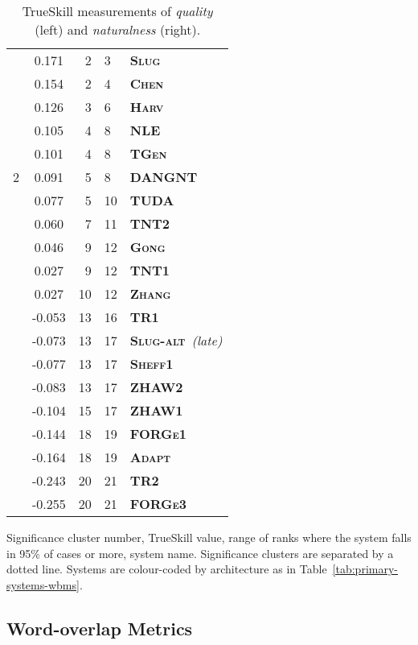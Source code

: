 \documentclass[11pt,a4paper]{article}
\newcommand\tgen{\textsc{TGen}\xspace}
\newcommand\slug{\textsc{Slug}\xspace}
\newcommand\slugalt{\textsc{Slug-alt}\xspace}
\newcommand\tntnlgi{\textsc{TNT1}\xspace}
\newcommand\tntnlgii{\textsc{TNT2}\xspace}
\newcommand\zhawi{\textsc{ZHAW1}\xspace}
\newcommand\zhawii{\textsc{ZHAW2}\xspace}
\newcommand\adapt{\textsc{Adapt}\xspace}
\newcommand\dangnt{\textsc{DANGNT}\xspace}
\newcommand\forgei{\textsc{FORGe1}\xspace}
\newcommand\forgeiii{\textsc{FORGe3}\xspace}
\newcommand\gong{\textsc{Gong}\xspace}
\newcommand\harv{\textsc{Harv}\xspace}
\newcommand\nle{\textsc{NLE}\xspace}
\newcommand\sheffi{\textsc{Sheff1}\xspace}
\newcommand\chen{\textsc{Chen}\xspace}
\newcommand\thomsoni{\textsc{TR1}\xspace}
\newcommand\thomsonii{\textsc{TR2}\xspace}
\newcommand\tuda{\textsc{TUDA}\xspace}
\newcommand\zhang{\textsc{Zhang}\xspace}
\newcommand{\symbseq}{}
\newcommand{\symbdd}{}
\newcommand{\symbrule}{}
\newcommand{\symbtempl}{}
\newcommand\Ctgen{\textcolor{seqtoseq}{\symbseq\bf \tgen}}
\newcommand\Cslug{\textcolor{seqtoseq}{\symbseq\bf \slug}}
\newcommand\Cslugalt{\textcolor{seqtoseq}{\symbseq\bf \slugalt}}
\newcommand\Ctntnlgi{\textcolor{seqtoseq}{\symbseq\bf \tntnlgi}}
\newcommand\Ctntnlgii{\textcolor{seqtoseq}{\symbseq\bf \tntnlgii}}
\newcommand\Czhawi{\textcolor{datadriven}{\symbdd\bf \zhawi}}
\newcommand\Czhawii{\textcolor{datadriven}{\symbdd\bf \zhawii}}
\newcommand\Cadapt{\textcolor{seqtoseq}{\symbseq\bf \adapt}}
\newcommand\Cdangnt{\textcolor{rules}{\symbrule\bf \dangnt}}
\newcommand\Cforgei{\textcolor{rules}{\symbrule\bf \forgei}}
\newcommand\Cforgeiii{\textcolor{templates}{\symbtempl\bf \forgeiii}}
\newcommand\Cgong{\textcolor{seqtoseq}{\symbseq\bf \gong}}
\newcommand\Charv{\textcolor{seqtoseq}{\symbseq\bf \harv}}
\newcommand\Cnle{\textcolor{seqtoseq}{\symbseq\bf \nle}}
\newcommand\Csheffi{\textcolor{datadriven}{\symbdd\bf \sheffi}}
\newcommand\Cchen{\textcolor{seqtoseq}{\symbseq\bf \chen}}
\newcommand\Cthomsoni{\textcolor{seqtoseq}{\symbseq\bf \thomsoni}}
\newcommand\Cthomsonii{\textcolor{templates}{\symbtempl\bf \thomsonii}}
\newcommand\Ctuda{\textcolor{templates}{\symbtempl\bf \tuda}}
\newcommand\Czhang{\textcolor{seqtoseq}{\symbseq\bf \zhang}}
\begin{document}
\begin{table*}[tp]
\begin{center}
\begin{tabular}{ccr@{--}ll}
\multirow{11}{*}{2}  & \phantom{-}0.171  & 2 & 3  & \Cslug \\
& \phantom{-}0.154  & 2 & 4  & \Cchen \\
& \phantom{-}0.126  & 3 & 6  & \Charv \\
& \phantom{-}0.105  & 4 & 8  & \Cnle \\
& \phantom{-}0.101  & 4 & 8  & \Ctgen \\
& \phantom{-}0.091  & 5 & 8  & \Cdangnt \\
& \phantom{-}0.077  & 5 & 10  & \Ctuda \\
& \phantom{-}0.060  & 7 & 11  & \Ctntnlgii \\
& \phantom{-}0.046  & 9 & 12  & \Cgong \\
& \phantom{-}0.027  & 9 & 12  & \Ctntnlgi \\
& \phantom{-}0.027  & 10 & 12  & \Czhang \\\hdashline[0.5pt/2pt]
\multirow{5}{*}{3}  & -0.053  & 13 & 16  & \Cthomsoni \\
& -0.073  & 13 & 17  & \Cslugalt~\emph{(late)} \\
& -0.077  & 13 & 17  & \Csheffi \\
& -0.083  & 13 & 17  & \Czhawii \\
& -0.104  & 15 & 17  & \Czhawi \\\hdashline[0.5pt/2pt]
\multirow{2}{*}{4}  & -0.144  & 18 & 19  & \Cforgei \\
& -0.164  & 18 & 19  & \Cadapt \\\hdashline[0.5pt/2pt]
\multirow{2}{*}{5}  & -0.243  & 20 & 21  & \Cthomsonii \\
& -0.255  & 20 & 21  & \Cforgeiii \\
\end{tabular}
\end{center}
\caption{TrueSkill measurements of \emph{quality} (left) and \emph{naturalness} (right).}\label{tab:trueskill}

\small
Significance cluster number, TrueSkill value, range of ranks where the system falls in 95\% of cases or more, system name. Significance clusters are separated by a dotted line. Systems are colour-coded by architecture as in Table~\ref{tab:primary-systems-wbms}.
\end{table*}

\subsection{Word-overlap Metrics}
\label{sec:results-automatic}
\end{document}
